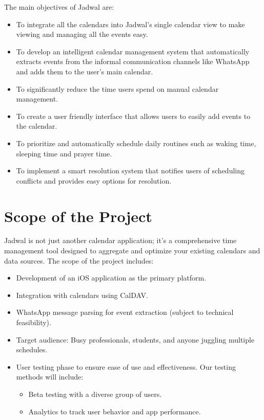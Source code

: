 \documentclass[12pt,a4paper]{report}
\begin{document}
The main objectives of Jadwal are:
\begin{itemize}
    
    \item To integrate all the calendars into Jadwal's single calendar view to make viewing and managing all the events easy.
    \item To develop an intelligent calendar management system that automatically extracts events from the informal communication channels like WhatsApp and adds them to the user's main calendar.
    \item To significantly reduce the time users spend on manual calendar management.
    \item To create a user friendly interface that allows users to easily add events to the calendar.
    \item  To prioritize and automatically schedule daily routines such as waking time, sleeping time and prayer time.
    \item To implement a smart resolution system that notifies users of scheduling conflicts and provides easy options for resolution.
\end{itemize}

\section{Scope of the Project}

Jadwal is not just another calendar application; it's a comprehensive time management tool designed to aggregate and optimize your existing calendars and data sources. The scope of the project includes:
\begin{itemize}
    \item Development of an iOS application as the primary platform.
    \item Integration with calendars using CalDAV.
    \item WhatsApp message parsing for event extraction (subject to technical feasibility).
    \item Target audience: Busy professionals, students, and anyone juggling multiple schedules.
    \item User testing phase to ensure ease of use and effectiveness. Our testing methods will include:
    \begin{itemize}
            \item Beta testing with a diverse group of users.
            \item Analytics to track user behavior and app performance.
        \end{itemize}
\end{itemize}
\end{document}
